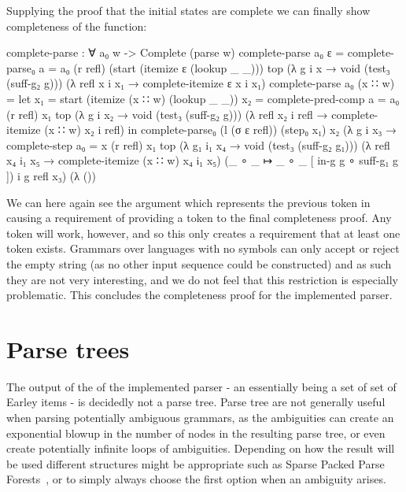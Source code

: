 		Supplying the proof that the initial states are complete we can finally
		show completeness of the  function:

		\begin{code}
			  complete-parse : ∀ a₀ w ->
			    Complete (parse w)
			  complete-parse a₀ ε =
			    complete-parse₀ {a = a₀} (r refl) (start (itemize ε (lookup _ _))) top
			      (λ {g i x → void (test₃ (suff-g₂ g))})
			      (λ {refl x i x₁ → complete-itemize ε x i x₁})
			  complete-parse a₀ (x ∷ w) =
			    let
			      x₁ = start (itemize (x ∷ w) (lookup _ _)) 
			      x₂ = complete-pred-comp {a = a₀} (r refl) x₁ top
			        (λ {g i x₂ → void (test₃ (suff-g₂ g))})
			        (λ {refl x₂ i refl → complete-itemize (x ∷ w) x₂ i refl})
			    in
			    complete-parse₀ (l (σ ε refl)) (step₀ x₁) x₂
			      (λ g i x₃ → complete-step {a₀ = x} (r refl) x₁ top
			        (λ {g₁ i₁ x₄ → void (test₃ (suff-g₂ g₁))})
			        (λ {refl x₄ i₁ x₅ → complete-itemize (x ∷ w) x₄ i₁ x₅})
			        (_ ∘ _ ↦ _ ∘ _ [ in-g g ∘ suff-g₁ g ]) i g refl x₃)
			      (λ ())
		\end{code}

		We can here again see the argument  which represents the
		previous token in  causing a requirement of
		providing a token to the final completeness proof. Any token will work,
		however, and so this only creates a requirement that at least one token
		exists. Grammars over languages with no symbols can only accept or
		reject the empty string (as no other input sequence could be
		constructed) and as such they are not very interesting, and we do not
		feel that this restriction is especially problematic. This concludes
		the completeness proof for the implemented parser.

	\section{Parse trees}

		The output of the of the implemented parser - an 
		essentially being a set of set of Earley items - is decidedly not a
		parse tree.  Parse tree are not generally useful when parsing
		potentially ambiguous grammars, as the ambiguities can create an
		exponential blowup in the number of nodes in the resulting parse tree,
		or even create potentially infinite loops of ambiguities. Depending on
		how the result will be used different structures might be appropriate
		such as Sparse Packed Parse Forests~\cite{?}, or to simply always
		choose the first option when an ambiguity arises.
